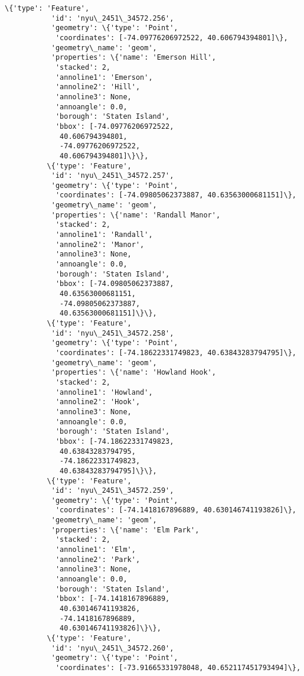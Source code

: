 \documentclass[11pt]{article}
\begin{document}
\begin{Verbatim}[commandchars=\\\{\}]
          \{'type': 'Feature',
           'id': 'nyu\_2451\_34572.256',
           'geometry': \{'type': 'Point',
            'coordinates': [-74.09776206972522, 40.606794394801]\},
           'geometry\_name': 'geom',
           'properties': \{'name': 'Emerson Hill',
            'stacked': 2,
            'annoline1': 'Emerson',
            'annoline2': 'Hill',
            'annoline3': None,
            'annoangle': 0.0,
            'borough': 'Staten Island',
            'bbox': [-74.09776206972522,
             40.606794394801,
             -74.09776206972522,
             40.606794394801]\}\},
          \{'type': 'Feature',
           'id': 'nyu\_2451\_34572.257',
           'geometry': \{'type': 'Point',
            'coordinates': [-74.09805062373887, 40.63563000681151]\},
           'geometry\_name': 'geom',
           'properties': \{'name': 'Randall Manor',
            'stacked': 2,
            'annoline1': 'Randall',
            'annoline2': 'Manor',
            'annoline3': None,
            'annoangle': 0.0,
            'borough': 'Staten Island',
            'bbox': [-74.09805062373887,
             40.63563000681151,
             -74.09805062373887,
             40.63563000681151]\}\},
          \{'type': 'Feature',
           'id': 'nyu\_2451\_34572.258',
           'geometry': \{'type': 'Point',
            'coordinates': [-74.18622331749823, 40.63843283794795]\},
           'geometry\_name': 'geom',
           'properties': \{'name': 'Howland Hook',
            'stacked': 2,
            'annoline1': 'Howland',
            'annoline2': 'Hook',
            'annoline3': None,
            'annoangle': 0.0,
            'borough': 'Staten Island',
            'bbox': [-74.18622331749823,
             40.63843283794795,
             -74.18622331749823,
             40.63843283794795]\}\},
          \{'type': 'Feature',
           'id': 'nyu\_2451\_34572.259',
           'geometry': \{'type': 'Point',
            'coordinates': [-74.1418167896889, 40.630146741193826]\},
           'geometry\_name': 'geom',
           'properties': \{'name': 'Elm Park',
            'stacked': 2,
            'annoline1': 'Elm',
            'annoline2': 'Park',
            'annoline3': None,
            'annoangle': 0.0,
            'borough': 'Staten Island',
            'bbox': [-74.1418167896889,
             40.630146741193826,
             -74.1418167896889,
             40.630146741193826]\}\},
          \{'type': 'Feature',
           'id': 'nyu\_2451\_34572.260',
           'geometry': \{'type': 'Point',
            'coordinates': [-73.91665331978048, 40.652117451793494]\},

\end{Verbatim}
\end{document}
